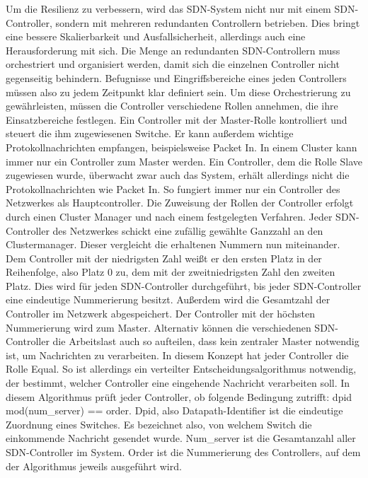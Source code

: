 Um die Resilienz zu verbessern, wird das \ac{SDN}-System nicht nur mit einem \ac{SDN}-Controller, sondern mit mehreren redundanten Controllern betrieben. Dies bringt eine bessere Skalierbarkeit und Ausfallsicherheit, 
allerdings auch eine Herausforderung mit sich. Die Menge an redundanten \ac{SDN}-Controllern muss orchestriert und organisiert werden, damit sich die einzelnen Controller nicht gegenseitig behindern. 
Befugnisse und Eingriffsbereiche eines jeden Controllers müssen also zu jedem Zeitpunkt klar definiert sein. Um diese Orchestrierung zu gewährleisten, müssen die Controller verschiedene Rollen annehmen, 
die ihre Einsatzbereiche festlegen. Ein Controller mit der Master-Rolle kontrolliert und steuert die ihm zugewiesenen Switche. Er kann außerdem wichtige Protokollnachrichten empfangen, beispielsweise Packet In. 
In einem Cluster kann immer nur ein Controller zum Master werden. Ein Controller, dem die Rolle Slave zugewiesen wurde, überwacht zwar auch das System, erhält allerdings nicht die Protokollnachrichten wie Packet In. 
So fungiert immer nur ein Controller des Netzwerkes als Hauptcontroller. Die Zuweisung der Rollen der Controller erfolgt durch einen Cluster Manager und nach einem festgelegten Verfahren. 
Jeder \ac{SDN}-Controller des Netzwerkes schickt eine zufällig gewählte Ganzzahl an den Clustermanager. Dieser vergleicht die erhaltenen Nummern nun miteinander. 
Dem Controller mit der niedrigsten Zahl weißt er den ersten Platz in der Reihenfolge, also Platz 0 zu, dem mit der zweitniedrigsten Zahl den zweiten Platz. Dies wird für jeden \ac{SDN}-Controller durchgeführt, 
bis jeder \ac{SDN}-Controller eine eindeutige Nummerierung besitzt. Außerdem wird die Gesamtzahl der Controller im Netzwerk abgespeichert. Der Controller mit der höchsten Nummerierung wird zum Master. 
Alternativ können die verschiedenen \ac{SDN}-Controller die Arbeitslast auch so aufteilen, dass kein zentraler Master notwendig ist, um Nachrichten zu verarbeiten. In diesem Konzept hat jeder Controller die Rolle Equal. 
So ist allerdings ein verteilter Entscheidungsalgorithmus notwendig, der bestimmt, welcher Controller eine eingehende Nachricht verarbeiten soll. In diesem Algorithmus prüft jeder Controller, ob folgende Bedingung zutrifft:
\newline 
dpid mod(num\_server) == order. 
\newline
Dpid, also Datapath-Identifier ist die eindeutige Zuordnung eines Switches. Es bezeichnet also, von welchem Switch die einkommende Nachricht gesendet wurde. 
Num\_server ist die Gesamtanzahl aller \ac{SDN}-Controller im System. Order ist die Nummerierung des Controllers, auf dem der Algorithmus jeweils ausgeführt wird. 
